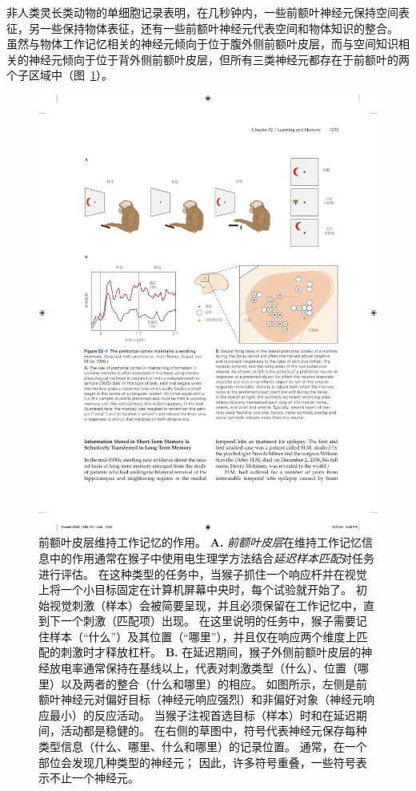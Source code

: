 非人类灵长类动物的单细胞记录表明，在几秒钟内，一些前额叶神经元保持空间表征，另一些保持物体表征，还有一些前额叶神经元代表空间和物体知识的整合。
虽然与物体工作记忆相关的神经元倾向于位于腹外侧前额叶皮层，而与空间知识相关的神经元倾向于位于背外侧前额叶皮层，但所有三类神经元都存在于前额叶的两个子区域中（图~\ref{fig:52_1}）。


\begin{figure}[htbp]
	\centering
	\includegraphics[width=1.0\linewidth]{chap52/fig_52_1}
	\caption{前额叶皮层维持工作记忆的作用\cite{rainer1998memory}。
		\textbf{A.} \textit{前额叶皮层}在维持工作记忆信息中的作用通常在猴子中使用电生理学方法结合\textit{延迟样本匹配}对任务进行评估。
		在这种类型的任务中，当猴子抓住一个响应杆并在视觉上将一个小目标固定在计算机屏幕中央时，每个试验就开始了。
		初始视觉刺激（样本）会被简要呈现，并且必须保留在工作记忆中，直到下一个刺激（匹配项）出现。
		在这里说明的任务中，猴子需要记住样本（“什么”）及其位置（“哪里”），并且仅在响应两个维度上匹配的刺激时才释放杠杆。
		\textbf{B.} 在延迟期间，猴子外侧前额叶皮层的神经放电率通常保持在基线以上，代表对刺激类型（什么）、位置（哪里）以及两者的整合（什么和哪里）的相应。
		如图所示，左侧是前额叶神经元对偏好目标（神经元响应强烈）和非偏好对象（神经元响应最小）的反应活动。
		当猴子注视首选目标（样本）时和在延迟期间，活动都是稳健的。
		在右侧的草图中，符号代表神经元保存每种类型信息（什么、哪里、什么和哪里）的记录位置。
		通常，在一个部位会发现几种类型的神经元；
		因此，许多符号重叠，一些符号表示不止一个神经元。}
	\label{fig:52_1}
\end{figure}


